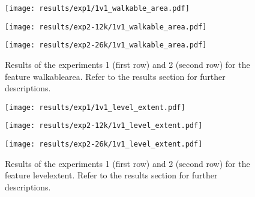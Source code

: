 \begin{figure}[h!]
	\centering
	\begin{minipage}{0.4\linewidth}
		\texttt{[image: results/exp1/1v1\_walkable\_area.pdf]}
	\end{minipage}
	
	\begin{minipage}{0.4\linewidth}
		\texttt{[image: results/exp2-12k/1v1\_walkable\_area.pdf]}
	\end{minipage}
	\begin{minipage}{0.4\linewidth}
		\texttt{[image: results/exp2-26k/1v1\_walkable\_area.pdf]}
	\end{minipage}
	
	\caption[ Results: Feature walkable\textunderscore area]{ Results of the experiments 1 (first row) and 2 (second row) for the feature walkable\textunderscore area. Refer to the results section for further descriptions. }
	\label{fig:appendix_walkable_area}
\end{figure}
\newpage 


\begin{figure}[h!]
	\centering
	\begin{minipage}{0.4\linewidth}
		\texttt{[image: results/exp1/1v1\_level\_extent.pdf]}
	\end{minipage}
	
	\begin{minipage}{0.4\linewidth}
		\texttt{[image: results/exp2-12k/1v1\_level\_extent.pdf]}
	\end{minipage}
	\begin{minipage}{0.4\linewidth}
		\texttt{[image: results/exp2-26k/1v1\_level\_extent.pdf]}
	\end{minipage}
	
	\caption[ Results: Feature level\textunderscore extent]{ Results of the experiments 1 (first row) and 2 (second row) for the feature level\textunderscore extent. Refer to the results section for further descriptions. }
	\label{fig:appendix_level_extent}
\end{figure}

